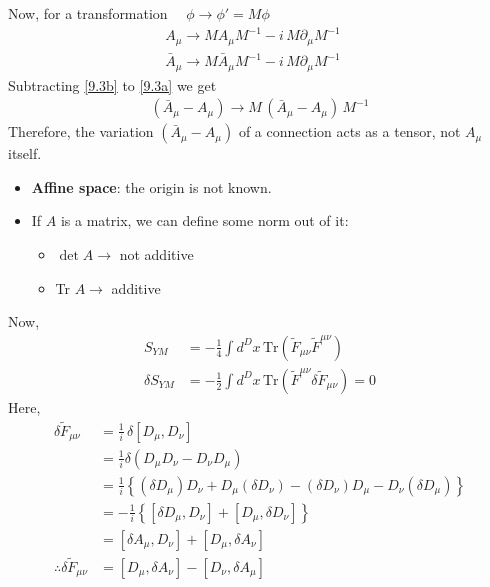 \documentclass[14pt]{article} %
\begin{document}
Now, for a transformation $\quad \phi \to \phi' = M \phi$
\begin{align*}
A_\mu \to M A_\mu M^{-1} - i \,M \partial_\mu M^{-1} \quad \tag{9.3a} \label{9.3a} \\
\bar{A}_\mu \to M \bar{A}_\mu M^{-1} - i\,M \partial_\mu M^{-1} \quad \tag{9.3b} \label{9.3b}
\end{align*}
Subtracting \eqref{9.3b} to \eqref{9.3a} we get
\begin{align*}
(\bar{A}_\mu - A_\mu) \to M\,(\bar{A}_\mu - A_\mu) \, M^{-1}
\end{align*}
Therefore, the variation $(\bar{A}_\mu - A_\mu)$ of a connection acts as a tensor, not $A_\mu$ itself.
\begin{tcolorbox}[ title=Extra information]
\begin{itemize}
\item [a)] \textbf{Affine space}: the origin is not known.
\item [b)] If $A$ is a matrix, we can define some norm out of it:
    \begin{itemize}
        \item $\det A \to$ not additive
        \item Tr $A \to$ additive
    \end{itemize}
\end{itemize}
\end{tcolorbox}
Now,
\begin{align*}
S_{YM} &= -\frac{1}{4} \int d^D x \, \mathrm{Tr}\left( \tilde{F}_{\mu \nu} \tilde{F}^{\mu \nu} \right) \\
\delta S_{YM} &= -\frac{1}{2} \int d^D x \, \mathrm{Tr}\left( \tilde{F}^{\mu \nu} \delta \tilde{F}_{\mu \nu} \right) =0 \tag{9.4} \label{9.4}
\end{align*}
Here,
\begin{align*}
\delta \tilde{F}_{\mu \nu} &= \frac{1}{i}\, \delta [D_\mu, D_\nu] \\
&= \frac{1}{i} \delta (D_\mu D_\nu - D_\nu D_\mu) \\
&= \frac{1}{i} \left\{ (\delta D_\mu) D_\nu + D_\mu (\delta D_\nu) - (\delta D_\nu) D_\mu - D_\nu (\delta D_\mu) \right\} \\
&= -\frac{1}{i} \left\{ [\delta D_\mu, D_\nu] + [D_\mu, \delta D_\nu] \right\} \\
&=[\delta A_\mu, D_\nu] + [D_\mu, \delta A_\nu] \\
\therefore \delta \tilde{F}_{\mu \nu} &= [D_\mu, \delta A_\nu] - [D_\nu, \delta A_\mu] \tag{9.5} \label{9.5}
\end{align*}
\end{document}

